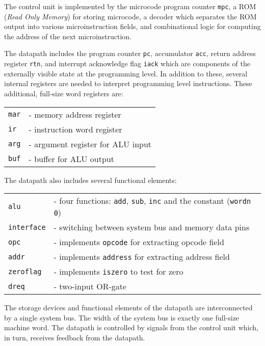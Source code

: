The control unit is implemented by
the microcode program counter \verb"mpc",
a ROM ({\it Read Only Memory}) for storing microcode,
a decoder which separates
the ROM output into various microinstruction fields,
and combinational logic for
computing the address of the next microinstruction.

The datapath includes
the program counter \verb"pc",
accumulator \verb"acc",
return address register \verb"rtn",
and interrupt acknowledge flag \verb"iack" which are components
of the externally visible state at the programming level.
In addition to these,
several internal registers are needed to interpret programming level
instructions.
These additional, full-size word registers are:

\begin{center}
\begin{tabular}{ll}
\verb"mar"& - memory address register\\
\verb"ir"& - instruction word register\\
\verb"arg"& - argument register for ALU input\\
\verb"buf"& - buffer for ALU output
\end{tabular}
\end{center}

The datapath also includes several functional elements:

\begin{center}
\begin{tabular}{ll}
\verb"alu" & - four functions: \verb"add", \verb"sub", \verb"inc"
and the constant (\verb"wordn 0")\\
\verb"interface" & - switching between system bus and memory data pins\\
\verb"opc" & - implements \verb"opcode" for extracting opcode field\\
\verb"addr" & - implements \verb"address" for extracting address field\\
\verb"zeroflag" & - implements \verb"iszero" to test for zero\\
\verb"dreq"& - two-input OR-gate
\end{tabular}
\end{center}

The storage devices and functional elements of the datapath are
interconnected by a single system bus.
The width of the system bus is exactly one full-size machine word.
The datapath is controlled by signals from the control unit which,
in turn, receives feedback from the datapath.

